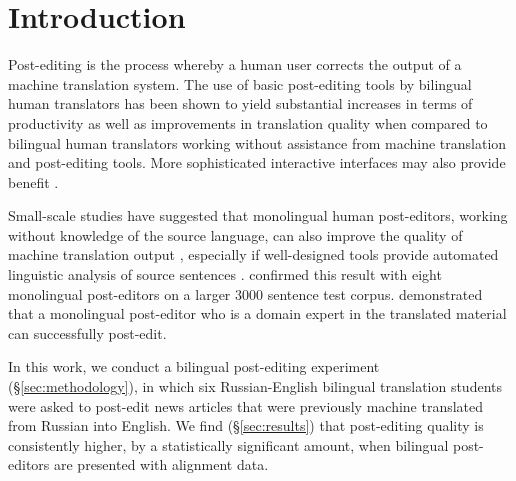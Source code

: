 
\section{Introduction}

Post-editing is the process whereby a human user corrects the output of a machine translation system.
%
The use of basic post-editing tools by bilingual human translators has been shown to yield substantial increases in terms of productivity \citep{2010_PBML_Plitt_Masselot} as well as improvements in translation quality \citep{2013_CHI_Green_etal} when compared to bilingual human translators working without assistance from machine translation and post-editing tools.
%
More sophisticated interactive interfaces \citep{2000_NAACL_Langlais_etal,2009_CL_Barrachina,2009_ACL_Koehn,2012_AMTA_Denkowski_Lavie} may also provide benefit \citep{2009_MT_Koehn}.

Small-scale studies have suggested that monolingual human post-editors, working without knowledge of the source language, can also improve the quality of machine translation output \citep{2005_NIST_CallisonBurch,2010_NAACL_Koehn,2013_WPTP_Mitchell_etal}, especially if well-designed tools provide automated linguistic analysis of source sentences \citep{2009_EACL_Albrecht_etal}.
%
\citet{2014_WMT_Schwartz_etal} confirmed this result with eight monolingual post-editors on a larger 3000 sentence test corpus.
%
\citet{2014_WPTP_Schwartz} demonstrated that a monolingual post-editor who is a domain expert in the translated material can successfully post-edit.

In this work, we conduct a bilingual post-editing experiment (\S\ref{sec:methodology}), in which six Russian-English bilingual translation students were asked to post-edit news articles that were previously machine translated from Russian into English.
%
We find (\S\ref{sec:results}) that post-editing quality is consistently higher, by a statistically significant amount, when bilingual post-editors are presented with alignment data.

